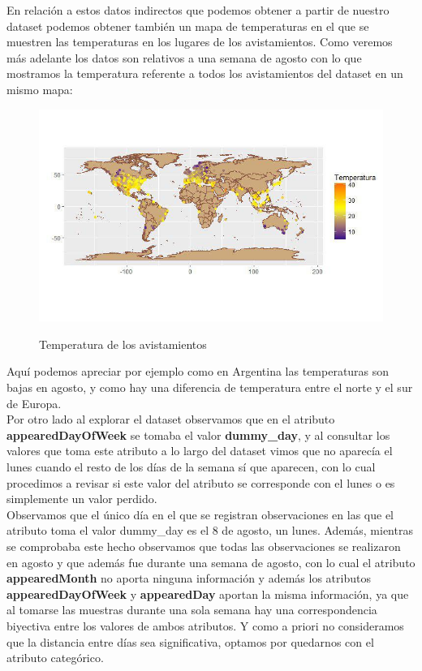 En relación a estos datos indirectos que podemos obtener a partir de nuestro dataset podemos obtener también un mapa de temperaturas en el que se muestren las temperaturas en los lugares de los avistamientos. Como veremos más adelante los datos son relativos a una semana de agosto con lo que mostramos la temperatura referente a todos los avistamientos del dataset en un mismo mapa:

\begin{figure}[H] %
\centering
\includegraphics[scale=0.8]{img/temperatura.jpg}  %
\label{img/temperatura.jpg}
\caption{Temperatura de los avistamientos}
\end{figure}

Aquí podemos apreciar por ejemplo como en Argentina las temperaturas son bajas en agosto, y como hay una diferencia de temperatura entre el norte y el sur de Europa.\\

Por otro lado al explorar el dataset observamos que en el atributo \textbf{appearedDayOfWeek} se tomaba el valor \textbf{dummy\_day}, y al consultar los valores que toma este atributo a lo largo del dataset vimos que no aparecía el lunes cuando el resto de los días de la semana sí que aparecen, con lo cual procedimos a revisar si este valor del atributo se corresponde con el lunes o es simplemente un valor perdido.\\

Observamos que el único día en el que se registran observaciones en las que el atributo toma el valor dummy\_day es el 8 de agosto, un lunes. Además, mientras se comprobaba este hecho observamos que todas las observaciones se realizaron en agosto y que además fue durante una semana de agosto, con lo cual el atributo \textbf{appearedMonth} no aporta ninguna información y además los atributos \textbf{appearedDayOfWeek} y \textbf{appearedDay} aportan la misma información, ya que al tomarse las muestras durante una sola semana hay una correspondencia biyectiva entre los valores de ambos atributos. Y como a priori no consideramos que la distancia entre días sea significativa, optamos por quedarnos con el atributo categórico.\\

